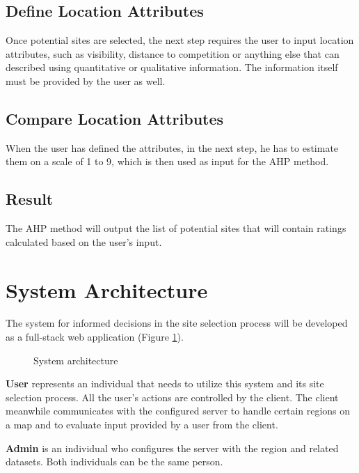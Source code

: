 \subsection{Define Location Attributes}

Once potential sites are selected, the next step requires the user to input location attributes, such as visibility, distance to competition or anything else that can described using quantitative or qualitative information. The information itself must be provided by the user as well.

\subsection{Compare Location Attributes}

When the user has defined the attributes, in the next step, he has to estimate them on a scale of 1 to 9, which is then used as input for the AHP method.

\subsection{Result}

The AHP method will output the list of potential sites that will contain ratings calculated based on the user's input.

\section{System Architecture}
\label{section:architecture}

The system for informed decisions in the site selection process will be developed as a full-stack web application (Figure \ref{fig:system-architecture}).

\begin{figure}[ht]\centering
  \centering
  
  \caption{System architecture}
  \label{fig:system-architecture}
\end{figure}

\textbf{User} represents an individual that needs to utilize this system and its site selection process. All the user's actions are controlled by the client. The client meanwhile communicates with the configured server to handle certain regions on a map and to evaluate input provided by a user from the client.

\textbf{Admin} is an individual who configures the server with the region and related datasets. Both individuals can be the same person.

